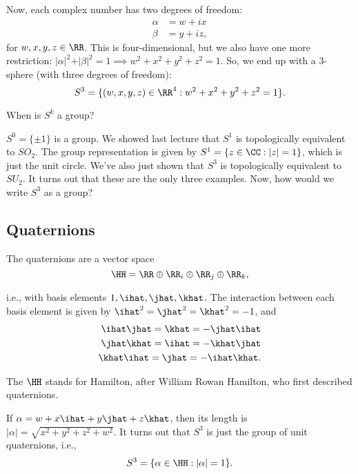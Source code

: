 Now, each complex number has two degrees of freedom:
\begin{align*}
    \alpha &= w+ix \\
    \beta &= y+iz,
\end{align*}
for $w,x,y,z\in \RR$. This is four-dimensional, but we also have one more restriction: $\vert \alpha\vert^2 + \vert \beta\vert^2 = 1\implies w^2+x^2+y^2+z^2=1$. So, we end up with a $3$-sphere (with three degrees of freedom): 
\[S^3 = \{(w,x,y,z)\in \RR^4 : w^2+x^2+y^2+z^2=1\}.\]

\begin{example}
\exlabel

When is $S^k$ a group? 
\end{example}

$S^0 = \{\pm 1\}$ is a group. We showed last lecture that $S^1$ is topologically equivalent to $SO_2$. The group representation is given by $S^1 = \{z\in \CC : \vert z\vert = 1\}$, which is just the unit circle. We've also just shown that $S^3$ is topologically equivalent to $SU_2$. It turns out that these are the only three examples. Now, how would we write $S^3$ as a group?

\subsection{Quaternions}

\begin{definition}

The \ac{quaternions} are a vector space
\[\HH = \RR \oplus \RR_i \oplus \RR_j \oplus \RR_k,\]

i.e., with basis elements $1,\ihat,\jhat,\khat$. The interaction between each basis element is given by $\ihat^2=\jhat^2=\khat^2=-1$, and 
\begin{align*}
    \ihat\jhat = \khat = -\jhat\ihat \\ 
    \jhat\khat = \ihat = -\khat\jhat \\ 
    \khat\ihat = \jhat = -\ihat\khat.
\end{align*}
\end{definition}

The $\HH$ stands for \ac{Hamilton}, after William Rowan Hamilton, who first described quaternions. 

If $\alpha = w+x\ihat+y\jhat+z\khat$, then its length is $\vert\alpha\vert = \sqrt{x^2+y^2+z^2+w^2}$. It turns out that $S^3$ is just the group of unit quaternions, i.e.,
\[S^3 = \{\alpha\in \HH : \vert\alpha\vert=1\}.\]


